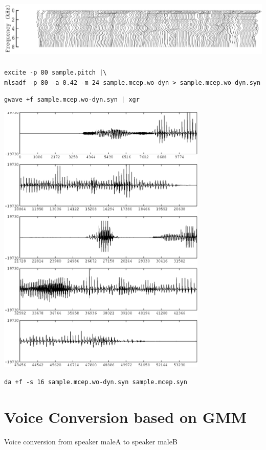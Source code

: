 \documentclass[a4paper,10pt]{article}
\begin{document}
\includegraphics[height=3cm]{eps/sample.mcep.wo-dyn.grlogsp-t.eps}

\begin{verbatim}
excite -p 80 sample.pitch |\
mlsadf -p 80 -a 0.42 -m 24 sample.mcep.wo-dyn > sample.mcep.wo-dyn.syn
\end{verbatim}

\begin{verbatim}
gwave +f sample.mcep.wo-dyn.syn | xgr
\end{verbatim}

\includegraphics[width=10cm]{eps/sample.mcep.wo-dyn.syn.gwave.eps}

\begin{verbatim}
da +f -s 16 sample.mcep.wo-dyn.syn sample.mcep.syn
\end{verbatim}

\section{Voice Conversion based on GMM}
Voice conversion from speaker maleA to speaker maleB
\end{document}
